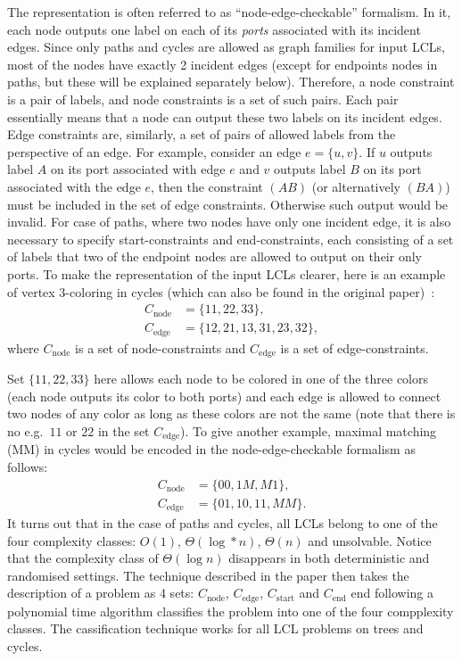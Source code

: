 The representation is often referred to as ``node-edge-checkable'' formalism.
In it, each node outputs one label on each of its \emph{ports} associated with
its incident edges. Since only paths and cycles are allowed as graph families for
input LCLs, most of the nodes have exactly 2 incident edges (except for endpoints nodes
in paths, but these will be explained separately below). Therefore, a node constraint
is a pair of labels, and node constraints is a set of such pairs. Each pair essentially
means that a node can output these two labels on its incident edges. Edge constraints are,
similarly, a set of pairs of allowed labels from the perspective of an edge. For example,
consider an edge $e = \{u, v\}$. If $u$ outputs label $A$ on its port associated with edge $e$
and $v$ outputs label $B$ on its port associated with the edge $e$, then the constraint $(AB)$
(or alternatively $(BA)$) must be included in the set of edge constraints. Otherwise such output
would be invalid. For case of paths, where two nodes have only one incident edge, it is also
necessary to specify start-constraints and end-constraints, each consisting of a set of labels
that two of the endpoint nodes are allowed to output on their only ports. To make the
representation of the input LCLs clearer, here is an example of vertex 3-coloring in cycles
(which can also be found in the original paper)~\cite{Chang2020}:
\begin{align*}
  C_{\textrm{node}} &= \{ 11, 22, 33 \}, \\
  C_{\textrm{edge}} &= \{ 12, 21, 13, 31, 23, 32 \},
\end{align*}
where $C_{\textrm{node}}$ is a set of node-constraints and $C_{\textrm{edge}}$ is a set of edge-constraints.

Set $\{ 11, 22, 33 \}$ here allows each node to be colored in one of the three colors
(each node outputs its color to both ports) and each edge is allowed to connect
two nodes of any color as long as these colors are not the same (note that there is no
e.g.\ $11$ or $22$ in the set $C_{\textrm{edge}}$). To give another example, maximal matching (MM) in cycles
would be encoded in the node-edge-checkable formalism as follows:
\begin{align*}
C_{\textrm{node}} &= \{ 00, 1M, M1 \}, \\
C_{\textrm{edge}} &= \{ 01, 10, 11, MM \}.
\end{align*}
It turns out that in the case of paths and cycles, all LCLs belong to one of the four
complexity classes: $O(1)$, $\Theta(\log* n)$, $\Theta(n)$ and unsolvable. Notice that
the complexity class of $\Theta(\log n)$ disappears in both deterministic and randomised settings.
The technique described in the paper then takes the description of a problem as 4 sets: $C_{\textrm{node}}$,
$C_{\textrm{edge}}$, $C_{\textrm{start}}$ and $C_{\textrm{end}}$ end following a polynomial time algorithm classifies the
problem into one of the four compplexity classes. The cassification technique works for all LCL
problems on trees and cycles.

